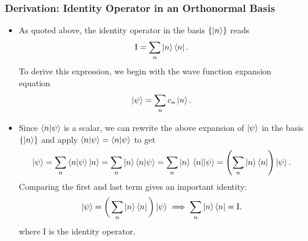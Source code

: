 \documentclass[11pt, a4paper]{article}
\newcommand{\p}{\psi}  %
\begin{document}
\subsubsection{Derivation: Identity Operator in an Orthonormal Basis}
\begin{itemize}
    \item As quoted above, the identity operator in the basis $ \{\ket{n}\} $ reads
    \begin{equation*}
        \mathrm{I} = \sum_{n} \ket{n}\bra{n}.
    \end{equation*}
    To derive this expression, we begin with the wave function expansion equation
    \begin{equation*}
        \ket{\psi} = \sum_{n}c_{n}\ket{n}.
    \end{equation*}

    \item Since $ \braket{n}{\psi} $ is a scalar, we can rewrite the above expansion of $ \ket{\psi} $ in the basis $ \{\ket{n}\} $ and apply $ \braket{n}{\psi} = \bra{n} \ket{\psi} $ to get
	\begin{equation*}
		\ket{\psi} = \sum_{n} \braket{n}{\psi} \ket{n} = \sum_{n} \ket{n} \braket{n}{\psi} = \sum_{n} \ket{n} \mel{n}{}{\psi} = \left(\sum_{n} \ket{n} \bra{n}\right) \ket{\psi}.
	\end{equation*}
	Comparing the first and last term gives an important identity:
	\begin{equation*}
		\ket{\p} = \bigg(\sum_{n} \ket{n} \bra{n}\bigg) \ket{\psi} \implies \sum_{n} \ket{n} \bra{n} = \mathrm{I}.
	\end{equation*}
	where $ \mathrm{I} $ is the identity operator. 

\end{itemize}
\end{document}
